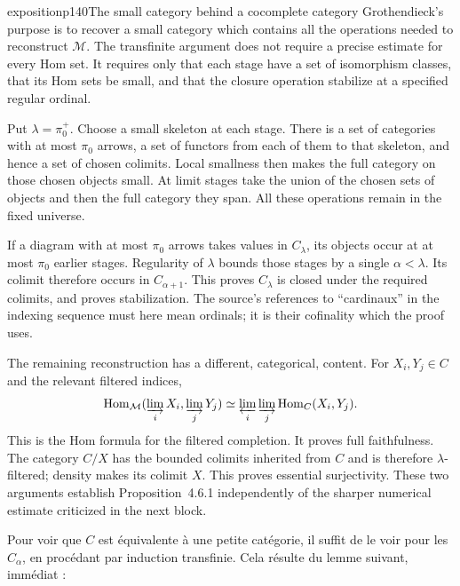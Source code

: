 \begin{dcomment}{exposition}{p140}{The small category behind a cocomplete category}
Grothendieck's purpose is to recover a small category which contains all the operations needed to reconstruct $\mathcal M$. The transfinite argument does not require a precise estimate for every Hom set. It requires only that each stage have a set of isomorphism classes, that its Hom sets be small, and that the closure operation stabilize at a specified regular ordinal.

Put $\lambda=\pi_0^+$. Choose a small skeleton at each stage. There is a set of categories with at most $\pi_0$ arrows, a set of functors from each of them to that skeleton, and hence a set of chosen colimits. Local smallness then makes the full category on those chosen objects small. At limit stages take the union of the chosen sets of objects and then the full category they span. All these operations remain in the fixed universe.

If a diagram with at most $\pi_0$ arrows takes values in $C_\lambda$, its objects occur at at most $\pi_0$ earlier stages. Regularity of $\lambda$ bounds those stages by a single $\alpha<\lambda$. Its colimit therefore occurs in $C_{\alpha+1}$. This proves $C_\lambda$ is closed under the required colimits, and proves stabilization. The source's references to ``cardinaux'' in the indexing sequence must here mean ordinals; it is their cofinality which the proof uses.

The remaining reconstruction has a different, categorical, content. For $X_i,Y_j\in C$ and the relevant filtered indices,
\[
 \operatorname{Hom}_{\mathcal M}(\varinjlim_iX_i,\varinjlim_jY_j)
 \simeq\varprojlim_i\varinjlim_j\operatorname{Hom}_C(X_i,Y_j).
\]
This is the Hom formula for the filtered completion. It proves full faithfulness. The category $C/X$ has the bounded colimits inherited from $C$ and is therefore $\lambda$-filtered; density makes its colimit $X$. This proves essential surjectivity. These two arguments establish Proposition~4.6.1 independently of the sharper numerical estimate criticized in the next block.
\end{dcomment}


Pour voir que $C$ est équivalente à une petite catégorie, il suffit de le voir pour les $C_\alpha$, en procédant par induction transfinie. Cela résulte du lemme suivant, immédiat :

